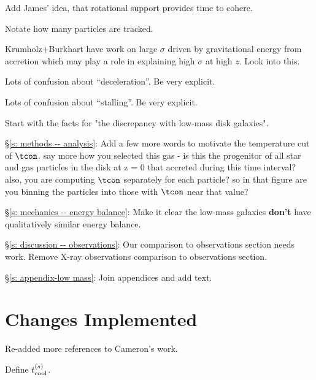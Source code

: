 Add James' idea, that rotational support provides time to cohere.

Notate how many particles are tracked.

Krumholz+Burkhart have work on large $\sigma$ driven by gravitational energy from accretion which may play a role in explaining high $\sigma$ at high $z$.
Look into this.

Lots of confusion about ``deceleration''.
Be very explicit.

Lots of confusion about ``stalling''.
Be very explicit.

Start with the facts for "the discrepancy with low-mass disk galaxies".

\S\ref{s: methods -- analysis}:
Add a few more words to motivate the temperature cut of $\tcon$.
say more how you selected this gas - is this the progenitor of all star and gas particles in the disk at z = 0 that accreted during this time interval?
also, you are computing $\tcon$ separately for each particle? so in that figure are you binning the particles into those with $\tcon$ near that value?

\S\ref{s: mechanics -- energy balance}:
Make it clear the low-mass galaxies \textbf{don't} have qualitatively similar energy balance.

\S\ref{s: discussion -- observations}:
Our comparison to observations section needs work.
Remove X-ray observations comparison to observations section.

\S\ref{s: appendix-low mass}:
Join appendices and add text.

\section{Changes Implemented}

Re-added more references to Cameron's work.

Define $t^{(s)}_{\rm cool}$.

